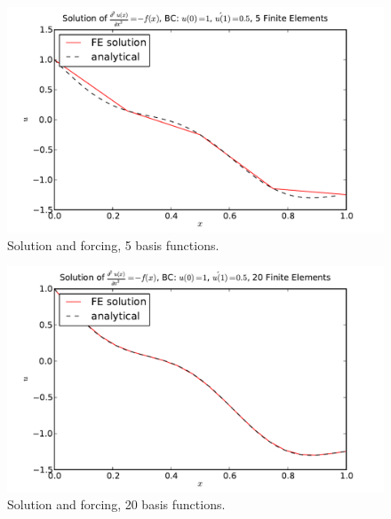 \documentclass[10pt]{article}
\begin{document}
\begin{figure}[ht]
    \centering
    \includegraphics[width=\columnwidth,keepaspectratio=true]{./hw7-solution_and_forcing-N5.pdf}
    \caption{Solution and forcing, 5 basis functions.}
    \label{fig:sf5}
\end{figure}

\begin{figure}[ht]
    \centering
    \includegraphics[width=\columnwidth,keepaspectratio=true]{./hw7-solution_and_forcing-N20.pdf}
    \caption{Solution and forcing, 20 basis functions.}
    \label{fig:sf20}
\end{figure}
\end{document}

